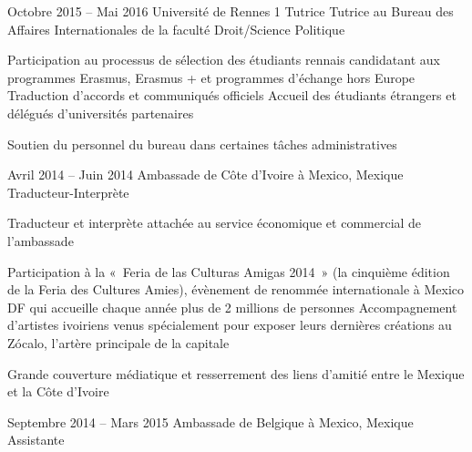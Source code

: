 \documentclass[30pt]{tccv}
\begin{document}
\begin{upshape}
\begin{experience}
\vspace{0.5cm}
\item{\color{text} Octobre 2015 -- Mai 2016}
     {Université de Rennes 1}
     {Tutrice}
     \fontsize{10pt}{1.1em}\color{text}\bodyfontlight\upshape\selectfont
{} Tutrice au Bureau des Affaires Internationales de la faculté Droit/Science Politique \\
\sloppy
{}%
    \setlength{\parskip}{-10pt}
    \begin{itemize}
      \cvitem[\checkmark] Participation au processus de sélection des étudiants rennais candidatant aux programmes Erasmus, Erasmus + et pro\-grammes d’échange hors Europe
      \cvitem[\checkmark] Traduction d’accords et communiqués officiels
      \cvitem[\checkmark] Accueil des étudiants étrangers et délégués d’uni\-ver\-sités par\-tenaires
    \end{itemize}     
 Soutien du personnel du bureau dans certaines tâches administratives 



\vspace{1.5cm}
\item{Avril 2014 -- Juin 2014}
     {Ambassade de Côte d’Ivoire à Mexico, Mexique}
     {Traducteur-Interprète}
     \fontsize{10pt}{1.1em}\color{text}\bodyfontlight\upshape\selectfont

 Traducteur et interprète attachée au service économique et commercial de l’ambassade  \\
    \setlength{\parskip}{-10pt}
    \begin{itemize}
      \cvitem[\checkmark] Participation à la « Feria de las Culturas Amigas 2014 » (la cinquième édition de la Feria des Cultures Amies), évènement de renommée internationale à Mexico DF qui accueille chaque année plus de 2 millions de personnes
      \cvitem[\checkmark] Accompagnement d’artistes ivoiriens venus spécialement pour exposer leurs dernières créations au Zócalo, l’artère principale de la capitale
    \end{itemize}     
 Grande couverture médiatique et resserrement des liens d’amitié entre le Mexique et la Côte d’Ivoire


\vspace{1.5cm}
\item{Septembre 2014 -- Mars 2015}
     {Ambassade de Belgique à Mexico, Mexique}
     {Assistante}
     \fontsize{10pt}{1.1em}\color{text}\bodyfontlight\upshape\selectfont


\end{experience}
\end{upshape}
\end{document}
